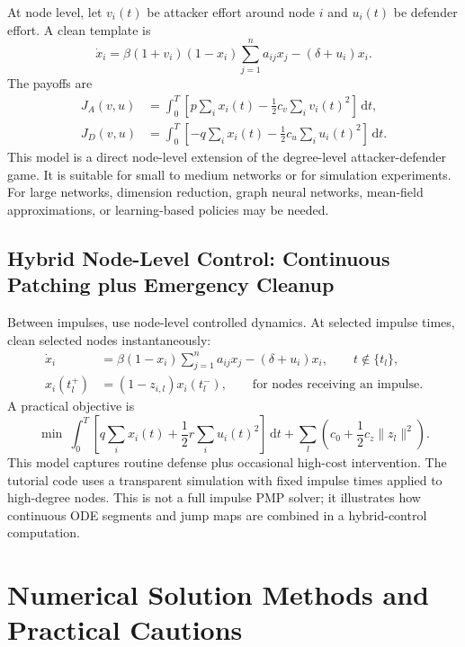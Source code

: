 \documentclass[11pt,a4paper]{article}
\newcommand{\dd}{\,\mathrm{d}}
\begin{document}
At node level, let $v_i(t)$ be attacker effort around node $i$ and $u_i(t)$ be defender effort. A clean template is
\begin{equation}
  \dot{x}_i=\beta(1+v_i)(1-x_i)\sum_{j=1}^n a_{ij}x_j-(\delta+u_i)x_i.
\end{equation}
The payoffs are
\begin{align}
  J_A(v,u)&=\int_0^T\left[p\sum_i x_i(t)-\frac{1}{2}c_v\sum_i v_i(t)^2\right]\dd t,\\
  J_D(v,u)&=\int_0^T\left[-q\sum_i x_i(t)-\frac{1}{2}c_u\sum_i u_i(t)^2\right]\dd t.
\end{align}
This model is a direct node-level extension of the degree-level attacker-defender game. It is suitable for small to medium networks or for simulation experiments. For large networks, dimension reduction, graph neural networks, mean-field approximations, or learning-based policies may be needed.

\subsection{Hybrid Node-Level Control: Continuous Patching plus Emergency Cleanup}

Between impulses, use node-level controlled dynamics. At selected impulse times, clean selected nodes instantaneously:
\begin{align}
  \dot{x}_i&=\beta(1-x_i)\sum_{j=1}^n a_{ij}x_j-(\delta+u_i)x_i,\qquad t\notin\{t_l\},\\
  x_i(t_l^+)&=(1-z_{i,l})x_i(t_l^-),\qquad \text{for nodes receiving an impulse.}
\end{align}
A practical objective is
\begin{equation}
  \min\ \int_0^T\left[q\sum_i x_i(t)+\frac{1}{2}r\sum_i u_i(t)^2\right]\dd t
  +\sum_l\left(c_0+\frac{1}{2}c_z\|z_l\|^2\right).
\end{equation}
This model captures routine defense plus occasional high-cost intervention. The tutorial code uses a transparent simulation with fixed impulse times applied to high-degree nodes. This is not a full impulse PMP solver; it illustrates how continuous ODE segments and jump maps are combined in a hybrid-control computation.

\section{Numerical Solution Methods and Practical Cautions}
\end{document}
